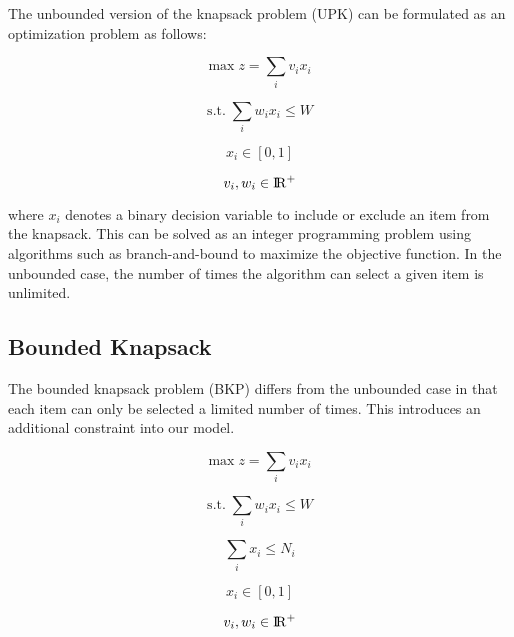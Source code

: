 \documentclass[12pt]{article}
\begin{document}
The unbounded version of the knapsack problem (UPK) can be formulated as an optimization problem as follows:

\begin{equation}
\textrm{max} \; z = \sum_i v_i x_i
\end{equation}

\begin{equation}
\textrm{s.t.} \; \sum_i w_i x_i \leq W
\end{equation}

\begin{equation}
x_i \in [0, 1]
\end{equation}

\begin{equation}
v_i, w_i \in \rm I\!R^+
\end{equation}

where $x_i$ denotes a binary decision variable to include or exclude an item from the knapsack. 
This can be solved as an integer programming problem using algorithms such as branch-and-bound to maximize the objective function. 
In the unbounded case, the number of times the algorithm can select a given item is unlimited.

\subsection{Bounded Knapsack}

The bounded knapsack problem (BKP) differs from the unbounded case in that each item can only be selected a limited number of times. 
This introduces an additional constraint into our model.

\begin{equation}
\textrm{max} \; z = \sum_i v_i x_i
\end{equation}

\begin{equation}
\textrm{s.t.} \; \sum_i w_i x_i \leq W
\end{equation}

\begin{equation}
\sum_i x_i \leq N_i
\end{equation}

\begin{equation}
x_i \in [0, 1]
\end{equation}

\begin{equation}
v_i, w_i \in \rm I\!R^+
\end{equation}
\end{document}
